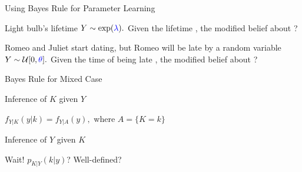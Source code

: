 \begin{frame}{Using Bayes Rule for Parameter Learning}



\plitemsep 0.07in

\exam

\bce
\item<2-> Light bulb's lifetime $Y \sim \exp({\color{blue} \lambda}).$ Given the lifetime , the modified belief about \bluef{$\lambda$}?

\item<3-> Romeo and Juliet start dating, but Romeo will be late by a random variable $Y \sim \mathcal U[0,{\color{blue} \theta}].$ Given the time of being late , the modified belief about \bluef{$\theta$}?
\ece

\end{frame}


\begin{frame}{Bayes Rule for Mixed Case}


\bigskip

\plitemsep 0.1in
{

\bci
\item<2-> Inference of $K$ given $Y$
\item<4-> $f_{Y|K}(y|k) = f_{Y | A}(y),$ where $A = \{K=k\}$
\eci

}
{
\bci



\item<2-> Inference of $Y$ given $K$
\item<6-> Wait! $p_{K|Y}(k|y)$? Well-defined?

\eci
}

\end{frame}

